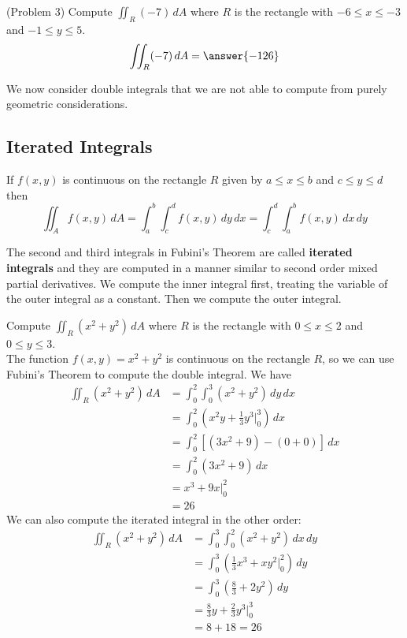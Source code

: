 \documentclass[handout]{ximera}
\begin{document}
\begin{problem}(Problem 3)
Compute $\iint_R (-7) \, dA$ where $R$ is the rectangle with $-6 \leq x \leq -3$ and $-1 \leq y \leq 5$.\\
\[
\iint_R (-7) \, dA = \answer{-126}
\]
\end{problem}

We now consider double integrals that we are not able to compute from purely geometric considerations.

\subsection{Iterated Integrals}

\begin{theorem}
If $f(x,y)$ is continuous on the rectangle $R$ given by $a \leq x \leq b$ and $c \leq y \leq d$
then
\[
\iint_A f(x,y) \, dA = \int_a^b \int_c^d f(x,y) \, dy\, dx = \int_c^d \int_a^b f(x,y) \, dx \, dy
\]
\end{theorem}

\begin{remark} The second and third integrals in Fubini's Theorem are called \textbf{iterated integrals}
and they are computed in a manner similar to second order mixed partial derivatives. We compute the inner integral first, treating the 
variable of the outer integral as a constant.  Then we compute the outer integral.
\end{remark}

\begin{example}[Example 4]
Compute $\iint_R (x^2 + y^2) \, dA$ where $R$ is the rectangle with $0 \leq x \leq 2$ and $0 \leq y \leq 3$.\\
The function $f(x,y) = x^2 + y^2$ is continuous on the rectangle $R$, so we can use Fubini's Theorem to compute the double integral.
We have
\begin{align*}
\iint_R (x^2 + y^2) \, dA &= \int_0^2 \int_0^3 (x^2 + y^2) \, dy\, dx\\
                          &= \int_0^2 \left(x^2 y + \frac13 y^3 \bigg|_0^3 \right) \, dx\\
                          &= \int_0^2 \left[(3x^2 + 9) - (0+0) \right] \, dx\\
                          &= \int_0^2 (3x^2 + 9) \, dx\\
                          &= x^3 + 9x \bigg|_0^2\\
                          &= 26
\end{align*}
We can also compute the iterated integral in the other order:
\begin{align*}
\iint_R (x^2 + y^2) \, dA &= \int_0^3 \int_0^2 (x^2 + y^2) \, dx\, dy\\
                          &= \int_0^3 \left( \frac13 x^3 + xy^2 \bigg|_0^2 \right) \, dy\\
                          &= \int_0^3 \left(\frac83 + 2y^2 \right) \, dy\\
                          &= \frac83 y + \frac23 y^3 \bigg|_0^3\\
                          &= 8 + 18 = 26
\end{align*}
\end{example}
\end{document}
